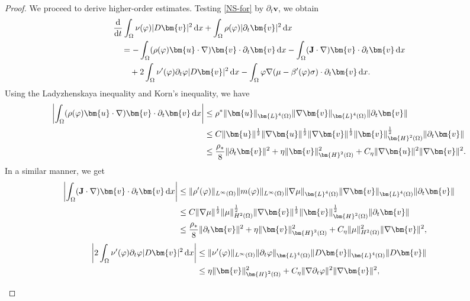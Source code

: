 \documentclass[11pt,reqno]{amsart}
\def\d{{\rm d}}
\def\H{\bm{H}}
\def\L{\bm{L}}
\def\J{\mathbf{J}}
\def\uu{\bm{u}}
\def\vv{\bm{v}}
\begin{document}
\begin{proof}
We proceed to derive higher-order estimates. Testing \eqref{NS-for} by $\partial_t\vv$, we obtain
\begin{align}
&\frac{\d}{\d t}\int_\Omega \nu(\varphi)|D\vv|^2\,\d x + \int_\Omega \rho(\varphi)|\partial_t \vv|^2\,\d x
\notag \\
&\quad = -\int_\Omega ( \rho(\varphi)\uu \cdot\nabla)\vv\cdot \partial_t \vv\,\d x
-\int_\Omega (  \J  \cdot\nabla )\vv\cdot \partial_t \vv\,\d x
\notag\\
&\qquad
+ 2\int_\Omega \nu'(\varphi)\partial_t\varphi|D\vv|^2\,\d x
-\int_\Omega \varphi \nabla (\mu -\beta'(\varphi) \sigma)\cdot \partial_t \vv\, \d x.
\label{NS-high1}
\end{align}
%
Using the Ladyzhenskaya inequality and Korn's inequality, we have
%
\begin{align}
\left|\int_\Omega ( \rho(\varphi)\uu \cdot\nabla)\vv\cdot \partial_t \vv\,\d x \right|
&\leq  \rho^* \|\uu\|_{\L^4(\Omega)}\|\nabla\vv\|_{\L^4(\Omega)}\|\partial_t\vv\|
\notag\\
&\leq C \|\uu\|^\frac12\|\nabla \uu\|^\frac12\|\nabla \vv\|^\frac12\|\vv\|_{\H^2(\Omega)}^\frac12
\|\partial_t\vv\|
\notag\\
&\leq \frac{\rho_*}{8}\|\partial_t\vv\|^2 + \eta \|\vv\|_{\H^2(\Omega)}^2+ C_\eta\|\nabla \uu\|^2\|\nabla \vv\|^2.
\notag
\end{align}
%
In a similar manner, we get
%
\begin{align}
\left|\int_\Omega (  \J  \cdot\nabla )\vv\cdot \partial_t \vv\,\d x \right|
&\leq  \|\rho'(\varphi)\|_{L^\infty(\Omega)}\|m(\varphi)\|_{L^\infty(\Omega)}\|\nabla \mu\|_{\L^4(\Omega)}\|\nabla \vv\|_{\L^4(\Omega)}\|\partial_t\vv\|
\notag\\
&\leq C\|\nabla \mu\|^\frac12 \|\mu\|_{H^2(\Omega)}^\frac12\|\nabla \vv\|^\frac12\|\vv\|_{\H^2(\Omega)}^\frac12
\|\partial_t\vv\|
\notag\\
&\leq \frac{\rho_*}{8}\|\partial_t\vv\|^2
+ \eta \|\vv\|_{\H^2(\Omega)}^2+ C_\eta\|\mu\|_{H^2(\Omega)}^2\|\nabla \vv\|^2,
\notag
\end{align}
%
\begin{align}
\left|2\int_\Omega \nu'(\varphi)\partial_t\varphi|D\vv|^2\,\d x\right|
&\leq \|\nu'(\varphi)\|_{L^\infty(\Omega)}\|\partial_t\varphi\|_{\L^4(\Omega)}\|D\vv\|_{\L^4(\Omega)}\|D\vv\|
\notag\\
&\leq \eta \|\vv\|_{\H^2(\Omega)}^2+ C_\eta\|\nabla \partial_t\varphi\|^2\|\nabla \vv\|^2,
\notag
\end{align}
%
\begin{align}

\end{align}
\end{proof}
\end{document}
